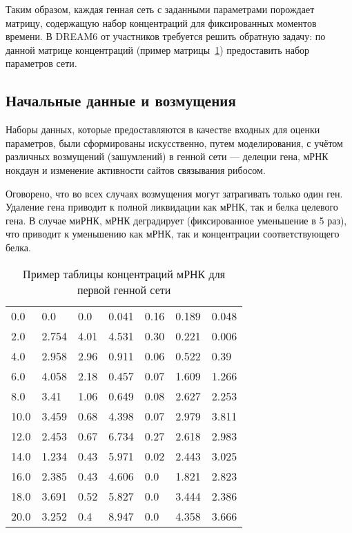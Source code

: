 Таким образом, каждая генная сеть с заданными параметрами порождает матрицу, 
содержащую набор концентраций для фиксированных моментов времени. В DREAM6 от
участников требуется решить обратную задачу: по данной матрице концентраций 
(пример матрицы~\ref{mRNAtable}) предоставить набор параметров сети.

\subsection{Начальные данные и возмущения} \label{s2_4}

Наборы данных, которые предоставляются в качестве входных для оценки параметров,
были сформированы искусственно, путем моделирования, с учётом различных 
возмущений (зашумлений) в генной сети — делеции гена, мРНК нокдаун и изменение 
активности сайтов связывания рибосом. 

Оговорено, что во всех случаях возмущения могут затрагивать только один ген. 
Удаление гена приводит к полной ликвидации как мРНК, так и белка целевого гена. 
В случае миРНК, мРНК деградирует (фиксированное уменьшение в 5 раз), что 
приводит к уменьшению как мРНК, так и концентрации соответствующего белка.

\begin{table}[h]
  \centering
    \begin{tabular}{l|llllll}
        0.0	  & 0.0    & 0.0   & 0.041  & 0.16  & 0.189  & 0.048 \\
        2.0	  & 2.754  & 4.01  & 4.531  & 0.30  & 0.221  & 0.006 \\
        4.0	  & 2.958  & 2.96  & 0.911  & 0.06  & 0.522  & 0.39  \\
        6.0	  & 4.058  & 2.18  & 0.457  & 0.07  & 1.609  & 1.266 \\
        8.0	  & 3.41   & 1.06  & 0.649  & 0.08  & 2.627  & 2.253 \\
        10.0  & 3.459  & 0.68  & 4.398  & 0.07  & 2.979  & 3.811 \\
        12.0  & 2.453  & 0.67  & 6.734  & 0.27  & 2.618  & 2.983 \\
        14.0  & 1.234  & 0.43  & 5.971  & 0.02  & 2.443  & 3.025 \\
        16.0  & 2.385  & 0.43  & 4.606  & 0.0   & 1.821  & 2.823 \\
        18.0  & 3.691  & 0.52  & 5.827  & 0.0   & 3.444  & 2.386 \\
        20.0  & 3.252  & 0.4   & 8.947  & 0.0   & 4.358  & 3.666 
    \end{tabular}
  \caption{Пример таблицы концентраций мРНК для первой генной сети}
  \label{mRNAtable}
\end{table}

